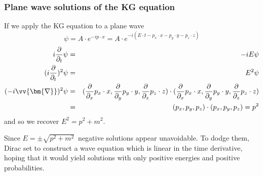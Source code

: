 
\begin{frame}
\frametitle{Plane wave solutions of the KG equation}
If we apply the KG equation to a plane wave
\[
 \psi = A \cdot e^{-ip \cdot x} = A \cdot e^{-i (E\cdot t - p_x \cdot x - p_y \cdot y - p_z \cdot z )}
 \]
 \begin{eqnarray*}
i \frac{\partial}{\partial_t} \psi & = & -i E \psi \\
(i \frac{\partial}{\partial_t})^2 \psi & = & E^2 \psi \\
(-i \vv{\bm{\nabla}})^2 \psi &= &(\frac{\partial}{\partial_x} p_x \cdot x, \frac{\partial}{\partial_y} p_y \cdot y,\frac{\partial}{\partial_z} p_z \cdot z) 
\cdot (\frac{\partial}{\partial_x} p_x \cdot x, \frac{\partial}{\partial_y} p_y \cdot y,\frac{\partial}{\partial_z} p_z \cdot z) \\
&=& (p_x, p_y, p_z) \cdot (p_x, p_y, p_z) = p^2
\end{eqnarray*}
and so we recover $E^2 = p^2 + m^2$.

\vspace{0.5cm}

Since $E = \pm \sqrt{p^2 + m^2}$~negative solutions appear unavoidable. To dodge them, Dirac set to 
construct a wave equation which is linear in the time derivative, hoping that it would yield solutions with only positive energies and positive probabilities.

\end{frame}
